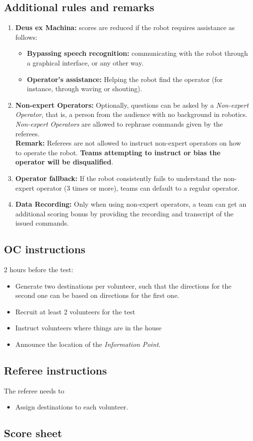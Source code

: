 \subsection*{Additional rules and remarks}
\begin{enumerate}[nosep]
	\item \textbf{Deus ex Machina:} scores are reduced if the robot requires assistance as follows:
	\begin{itemize}[nosep]
		\item \textbf{Bypassing speech recognition:} communicating with the robot through a graphical interface, or any other way.
		
		\item \textbf{Operator's assistance:} Helping the robot find the operator (for instance, through waving or shouting).
	\end{itemize}

	\item \textbf{Non-expert Operators:} Optionally, questions can be asked by a \emph{Non-expert Operator}, that is, a person from the audience with no background in robotics. \emph{Non-expert Operators} are allowed to rephrase commands given by the referees.
	\\\textbf{Remark:} Referees are not allowed to instruct non-expert operators on how to operate the robot. \textbf{Teams attempting to instruct or bias the operator will be disqualified}.

	\item \textbf{Operator fallback:} If the robot consistently fails to understand the non-expert operator (3 times or more), teams can default to a regular operator.
	
	\item \textbf{Data Recording:} Only when using non-expert operators, a team can get an additional scoring bonus by providing the recording and transcript of the issued commands.

\end{enumerate}

\subsection*{OC instructions}
2 hours before the test:
\begin{itemize}
	\item Generate two destinations per volunteer, such that the directions for the second one can be based on directions for the first one.
	\item Recruit at least 2 volunteers for the test
	\item Instruct volunteers where things are in the house
	\item Announce the location of the \emph{Information Point}.
\end{itemize}

\subsection*{Referee instructions}
The referee needs to
\begin{itemize}
	\item Assign destinations to each volunteer.
\end{itemize}

\subsection*{Score sheet}

